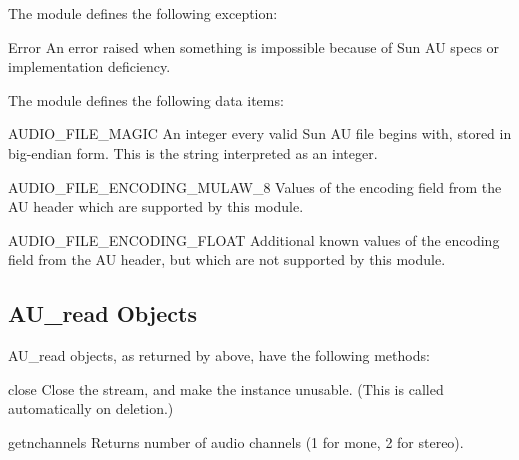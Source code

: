 The  module defines the following exception:

\begin{excdesc}{Error}
An error raised when something is impossible because of Sun AU specs or 
implementation deficiency.
\end{excdesc}

The  module defines the following data items:

\begin{datadesc}{AUDIO_FILE_MAGIC}
An integer every valid Sun AU file begins with, stored in big-endian
form.  This is the string  interpreted as an integer.
\end{datadesc}

\begin{datadesc}{AUDIO_FILE_ENCODING_MULAW_8}
Values of the encoding field from the AU header which are supported by
this module.
\end{datadesc}

\begin{datadesc}{AUDIO_FILE_ENCODING_FLOAT}
Additional known values of the encoding field from the AU header, but
which are not supported by this module.
\end{datadesc}


\subsection{AU_read Objects \label{au-read-objects}}

AU_read objects, as returned by  above, have the
following methods:

\begin{methoddesc}[AU_read]{close}{}
Close the stream, and make the instance unusable. (This is 
called automatically on deletion.)
\end{methoddesc}

\begin{methoddesc}[AU_read]{getnchannels}{}
Returns number of audio channels (1 for mone, 2 for stereo).
\end{methoddesc}

